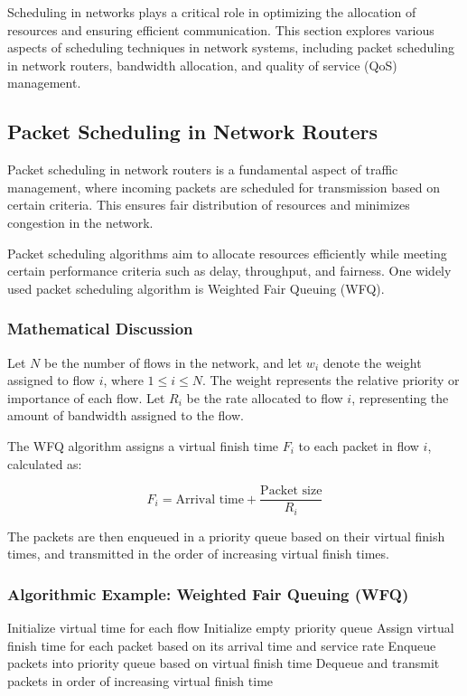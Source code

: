 \documentclass[12pt]{book} %
\begin{document}
Scheduling in networks plays a critical role in optimizing the allocation of resources and ensuring efficient communication. This section explores various aspects of scheduling techniques in network systems, including packet scheduling in network routers, bandwidth allocation, and quality of service (QoS) management.

\subsection{Packet Scheduling in Network Routers}

Packet scheduling in network routers is a fundamental aspect of traffic management, where incoming packets are scheduled for transmission based on certain criteria. This ensures fair distribution of resources and minimizes congestion in the network.

Packet scheduling algorithms aim to allocate resources efficiently while meeting certain performance criteria such as delay, throughput, and fairness. One widely used packet scheduling algorithm is Weighted Fair Queuing (WFQ).

\subsubsection{Mathematical Discussion}

Let $N$ be the number of flows in the network, and let $w_i$ denote the weight assigned to flow $i$, where $1 \leq i \leq N$. The weight represents the relative priority or importance of each flow. Let $R_i$ be the rate allocated to flow $i$, representing the amount of bandwidth assigned to the flow.

The WFQ algorithm assigns a virtual finish time $F_i$ to each packet in flow $i$, calculated as:

\begin{equation*}
    F_i = \text{Arrival time} + \frac{\text{Packet size}}{R_i}
\end{equation*}

The packets are then enqueued in a priority queue based on their virtual finish times, and transmitted in the order of increasing virtual finish times.

\subsubsection{Algorithmic Example: Weighted Fair Queuing (WFQ)}
\FloatBarrier
\begin{algorithm}[H]
\caption{Weighted Fair Queuing (WFQ)}
\begin{algorithmic}[1]
\State Initialize virtual time for each flow
\State Initialize empty priority queue
    \State Assign virtual finish time for each packet based on its arrival time and service rate
    \State Enqueue packets into priority queue based on virtual finish time
    \State Dequeue and transmit packets in order of increasing virtual finish time
\EndWhile
\end{algorithmic}
\end{algorithm}
\FloatBarrier
\end{document}
